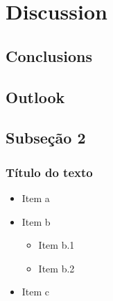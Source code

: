 \documentclass[t]{beamer}
\begin{document}
\section{Discussion}

\subsection{Conclusions}

\subsection{Outlook}

\subsection*{Subseção 2}

\begin{frame}
\frametitle{Título do texto}
\begin{itemize}
\item Item a
\item Item b
\begin{itemize}
\item Item b.1
\item Item b.2
\end{itemize}
\item Item c
\end{itemize}
\end{frame}
\end{document}
